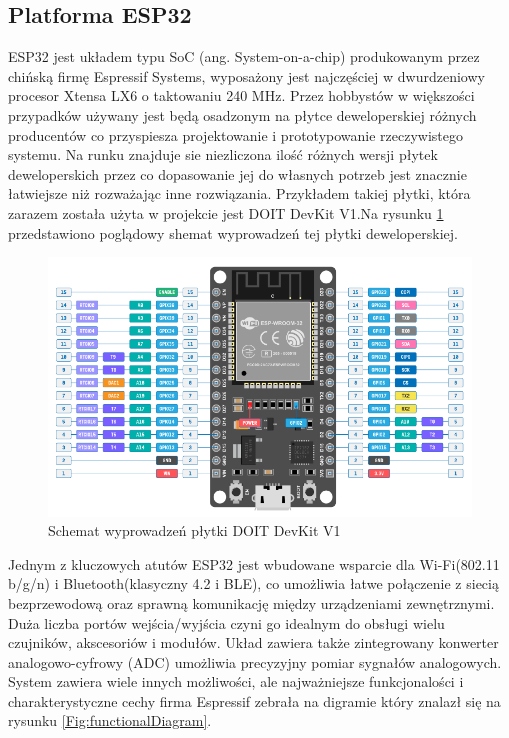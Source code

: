\documentclass[12pt,twoside]{article}
\begin{document}
\subsection{Platforma ESP32}
ESP32 jest układem typu SoC (ang. System-on-a-chip) produkowanym przez chińską firmę Espressif Systems,
wyposażony jest najczęściej w dwurdzeniowy procesor Xtensa LX6 o taktowaniu 240 MHz\cite{esp32Datasheet}. Przez hobbystów w większości przypadków używany jest będą osadzonym na płytce deweloperskiej różnych producentów co przyspiesza projektowanie i prototypowanie rzeczywistego systemu. Na runku znajduje sie niezliczona ilość różnych wersji płytek deweloperskich przez co dopasowanie
jej do własnych potrzeb jest znacznie łatwiejsze niż rozważając inne rozwiązania. Przykładem takiej płytki, która zarazem została użyta w projekcie jest DOIT DevKit V1\cite{doitDevKitV1}.Na rysunku \ref*{Fig:devkitScheme} przedstawiono poglądowy shemat wyprowadzeń tej płytki deweloperskiej.

\begin{figure}[ht]
   \centering
   \includegraphics[width=13cm]{images/doit_devkit_v1.png}
   \caption{Schemat wyprowadzeń płytki DOIT DevKit V1 \cite{doitDevKitV1}}
   \label{Fig:devkitScheme}
\end{figure}

Jednym z kluczowych atutów ESP32 jest wbudowane wsparcie dla Wi-Fi(802.11 b/g/n) i Bluetooth(klasyczny 4.2 i BLE),
co umożliwia łatwe połączenie z siecią bezprzewodową oraz sprawną komunikację między urządzeniami zewnętrznymi.
Duża licz\-ba portów wejścia/wyjścia czyni go idealnym do obsługi wielu czujników, akscesoriów i modułów. Układ zawiera także
zintegrowany konwerter analogowo-cyfrowy (ADC) umożliwia precyzyjny pomiar sygnałów analogowych. System zawiera wiele innych możliwości, ale najważniejsze funkcjonalości i charakterystyczne cechy firma Espressif zebrała na digramie który znalazł się na rysunku \ref*{Fig:functionalDiagram}.
\end{document}
